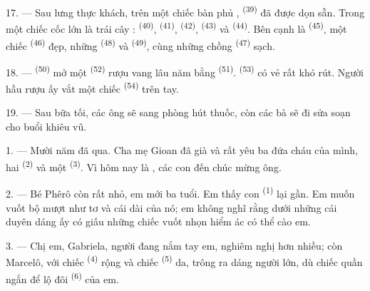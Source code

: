 \VUsaut{2.4mm}
\VUsaut{3.0mm}

17. --- Sau lưng thực khách, trên một chiếc bàn phủ ,  \textsuperscript{(39)} đã được dọn sẵn. Trong một chiếc cốc lớn là trái cây :
 \textsuperscript{(40)},  \textsuperscript{(41)}, 
\textsuperscript{(42)},  \textsuperscript{(43)} và 
\textsuperscript{(44)}. Bên cạnh là  \textsuperscript{(45)}, một chiếc
 \textsuperscript{(46)} đẹp, những 
\textsuperscript{(48)} và  \textsuperscript{(49)}, cùng những chồng
 \textsuperscript{(47)} sạch.

18. ---  \textsuperscript{(50)} mở một 
\textsuperscript{(52)} rượu vang lâu năm bằng 
\textsuperscript{(51)}.  \textsuperscript{(53)} có vẻ rất khó rút. Người
hầu rượu ấy vắt một chiếc  \textsuperscript{(54)} trên tay.

19. --- Sau bữa tối, các ông sẽ sang phòng hút thuốc, còn các bà sẽ đi sửa soạn cho
buổi khiêu vũ.

\VUsaut{5.0mm}
\VUsaut{1.6mm}
\VUsaut{2.6mm}

\VUsaut{3.0mm}

1. --- Mười năm đã qua. Cha mẹ Gioan đã già và rất yêu ba đứa cháu của mình, hai
 \textsuperscript{(2)} và một 
\textsuperscript{(3)}. Vì hôm nay là , các con đến chúc
mừng ông.

2. --- Bé Phêrô còn rất nhỏ, em mới ba tuổi. Em thấy con 
\textsuperscript{(1)} lại gần. Em muốn vuốt bộ  mượt như tơ và cái
 dài của nó; em không nghĩ rằng dưới những cái  duyên dáng ấy
có giấu những chiếc vuốt nhọn hiểm ác có thể cào em.

3. --- Chị em, Gabriela, người đang nắm tay em, nghiêm nghị hơn nhiều; còn Marcelô, với
chiếc  \textsuperscript{(4)} rộng và chiếc 
\textsuperscript{(5)} da, trông ra dáng người lớn, dù chiếc quần ngắn để lộ đôi
 \textsuperscript{(6)} của em.


